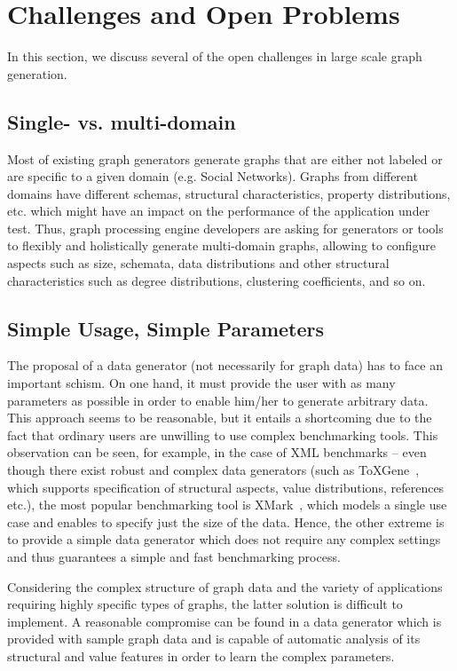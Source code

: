 \section{Challenges and Open Problems}
\label{sec:challenges}

In this section, we discuss several of the open challenges in large scale graph
generation.

\subsection{Single- vs. multi-domain}

Most of existing graph generators generate graphs that are either not labeled or
are specific to a given domain (e.g.  Social Networks). Graphs from different
domains have different schemas, structural characteristics, property
distributions, etc. which might have an impact on the performance of the
application under test. Thus, graph processing engine developers are asking for
generators or tools to flexibly and holistically generate multi-domain graphs, allowing to configure aspects
such as size, schemata, data distributions and other structural
characteristics such as degree distributions, clustering coefficients, and
so on.


\subsection{Simple Usage, Simple Parameters}
The proposal of a data generator (not necessarily for graph data) has to face an
important schism. On one hand, it must provide the user with as
many parameters as possible in order to enable him/her to generate
arbitrary data.
This approach seems to be reasonable, but it entails a shortcoming due to
the fact that ordinary users are
unwilling to use complex benchmarking tools. This observation can be
seen, for example, in the case of XML benchmarks -- even though there exist
robust and complex data generators (such as
ToXGene~\cite{conf/webdb/BarbosaMKL02}, which supports specification of
structural aspects, value distributions, references etc.), the most popular
benchmarking tool is XMark~\cite{Schmidt:2002:XBX:1287369.1287455}, which models
a single use case and enables to specify just the size of the data. Hence, the
other extreme is to provide a simple data generator which does not require any
complex settings and thus guarantees a simple and fast benchmarking process.

Considering the complex structure of graph data and the variety of applications
requiring highly specific types of graphs, the latter solution is difficult to
implement. A reasonable compromise can be found in a data generator which is
provided with sample graph data and is capable of automatic analysis of its
structural and value features in order to learn the complex parameters.

